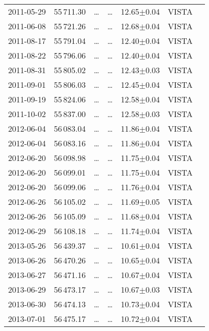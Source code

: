\documentclass{aa}
\begin{document}
\begin{appendix}
\begin{table*}
\begin{tabular}{ccccccc}
2011-05-29 & 55\,711.30		  & \dots	     & \dots		& 12.65$\pm$0.04   & VISTA \\
2011-06-08 & 55\,721.26		  & \dots	     & \dots		& 12.68$\pm$0.04   & VISTA \\
2011-08-17 & 55\,791.04		  & \dots	     & \dots		& 12.40$\pm$0.04   & VISTA \\
2011-08-22 & 55\,796.06		  & \dots	     & \dots		& 12.40$\pm$0.04   & VISTA \\
2011-08-31 & 55\,805.02		  & \dots	     & \dots		& 12.43$\pm$0.03   & VISTA \\
2011-09-01 & 55\,806.03		  & \dots	     & \dots		& 12.45$\pm$0.04   & VISTA \\
2011-09-19 & 55\,824.06		  & \dots	     & \dots		& 12.58$\pm$0.04   & VISTA \\
2011-10-02 & 55\,837.00		  & \dots	     & \dots		& 12.58$\pm$0.03   & VISTA \\
2012-06-04 & 56\,083.04		  & \dots	     & \dots		& 11.86$\pm$0.04   & VISTA \\
2012-06-04 & 56\,083.16		  & \dots	     & \dots		& 11.86$\pm$0.04   & VISTA \\
2012-06-20 & 56\,098.98		  & \dots	     & \dots		& 11.75$\pm$0.04   & VISTA \\
2012-06-20 & 56\,099.01		  & \dots	     & \dots		& 11.75$\pm$0.04   & VISTA \\
2012-06-20 & 56\,099.06		  & \dots	     & \dots		& 11.76$\pm$0.04   & VISTA \\
2012-06-26 & 56\,105.02		  & \dots	     & \dots		& 11.69$\pm$0.05   & VISTA \\
2012-06-26 & 56\,105.09		  & \dots	     & \dots		& 11.68$\pm$0.04   & VISTA \\
2012-06-29 & 56\,108.18		  & \dots	     & \dots		& 11.74$\pm$0.04   & VISTA \\
2013-05-26 & 56\,439.37		  & \dots	     & \dots		& 10.61$\pm$0.04   & VISTA \\
2013-06-26 & 56\,470.26		  & \dots	     & \dots		& 10.65$\pm$0.04   & VISTA \\
2013-06-27 & 56\,471.16		  & \dots	     & \dots		& 10.67$\pm$0.04   & VISTA \\
2013-06-29 & 56\,473.17		  & \dots	     & \dots		& 10.67$\pm$0.03   & VISTA \\
2013-06-30 & 56\,474.13		  & \dots	     & \dots		& 10.73$\pm$0.04   & VISTA \\
2013-07-01 & 56\,475.17		  & \dots	     & \dots		& 10.72$\pm$0.04   & VISTA \\

\end{tabular}
\end{table*}
\end{appendix}
\end{document}

